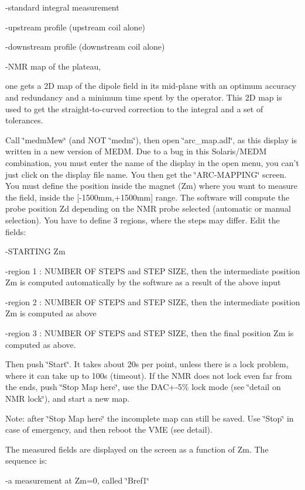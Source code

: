 -standard integral measurement 

-upstream profile (upstream coil alone) 

-downstream profile (downstream coil alone) 

-NMR map of the plateau, 

one gets a 2D map of the dipole field in its mid-plane with an optimum accuracy
and redundancy and a minimum time spent by the operator. This 2D map is used
to get the straight-to-curved correction to the integral and a set of tolerances.

Call \char`\"{}medmMew\char`\"{} (and NOT \char`\"{}medm\char`\"{}), then open
\char`\"{}arc\_map.adl\char`\"{}, as this display is written in a new version
of MEDM. Due to a bug in this Solaris/MEDM combination, you must enter the name
of the display in the open menu, you can't just click on the display file name.
You then get the \char`\"{}ARC-MAPPING\char`\"{} screen. You must define the
position inside the magnet (Zm) where you want to measure the field, inside the
{[}-1500mm,+1500mm{]} range. The software will compute the probe position Zd
depending on the NMR probe selected (automatic or manual selection). You have
to define 3 regions, where the steps may differ. Edit the fields: 

-STARTING Zm 

-region 1 : NUMBER OF STEPS and STEP SIZE, then the intermediate position
Zm is computed automatically by the software as a result of the above input 

-region 2 : NUMBER OF STEPS and STEP SIZE, then the intermediate position
Zm is computed as above 

-region 3 : NUMBER OF STEPS and STEP SIZE, then the final position
Zm is computed as above. 

Then push \char`\"{}Start\char`\"{}. It takes about 20s per
point, unless there is a lock
problem, where it can take up to 100s (timeout). If the NMR does not lock
even far from the ends, push \char`\"{}Stop Map here\char`\"{}, use the DAC+-5\%
lock mode (see \char`\"{}detail on NMR lock\char`\"{}), and start a new map. 

Note: after \char`\"{}Stop Map here\char`\"{} the incomplete map can still be
saved. Use \char`\"{}Stop\char`\"{} in case of emergency, and then reboot the
VME (see detail). 

The measured fields are displayed on the screen as a function of Zm. The sequence
is: 

-a measurement at Zm=0, called \char`\"{}Bref1\char`\"{} 

